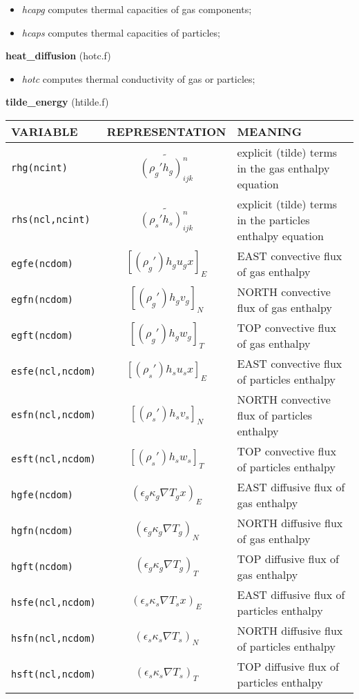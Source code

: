 \begin{itemize}
\item{\em hcapg} computes thermal capacities of gas components;
\item{\em hcaps} computes thermal capacities of particles;
\end{itemize}
%
%
{\large{\bf heat\_diffusion}} (hotc.f)\\
\begin{itemize}
\item{\em hotc} computes thermal conductivity of gas or particles;
\end{itemize}
%
%
{\large {\bf tilde\_energy}} (htilde.f)\\[5mm]
\begin{tabular}{|p{6cm}|c|p{6cm}|}\hline
VARIABLE & REPRESENTATION & MEANING\\\hline
\tt rhg(ncint) & $\widetilde{(\rho_g'h_g)_{ijk}^n}$ & explicit (tilde) terms in the gas enthalpy equation\\\hline
\tt rhs(ncl,ncint)& $\widetilde{(\rho_s' h_s)_{ijk}^n}$ & explicit (tilde) terms in the particles enthalpy equation\\\hline
\tt egfe(ncdom) & $\left[ (\rho_g')h_g u_g x \right]_{E}$ &EAST convective flux of gas enthalpy\\\hline
\tt egfn(ncdom) & $\left[ (\rho_g')h_g v_g \right]_{N}$ &NORTH convective flux of gas enthalpy\\\hline
\tt egft(ncdom) & $\left[ (\rho_g')h_g w_g \right]_{T}$ &TOP convective flux of gas enthalpy\\\hline
\tt esfe(ncl,ncdom)& $\left[ (\rho_s')h_su_s x\right]_{E}$ &EAST convective flux of particles enthalpy\\\hline
\tt esfn(ncl,ncdom)& $\left[ (\rho_s')h_sv_s \right]_{N}$ &NORTH convective flux of particles enthalpy\\\hline
\tt esft(ncl,ncdom)& $\left[ (\rho_s')h_sw_s \right]_{T}$ &TOP convective flux of particles enthalpy\\\hline
\tt hgfe(ncdom)&$ (\epsilon_g \kappa_g \nabla T_gx)_{E}$ &EAST diffusive flux of gas enthalpy\\\hline
\tt hgfn(ncdom)&$ (\epsilon_g \kappa_g \nabla T_g)_{N}$ &NORTH diffusive flux of gas enthalpy\\\hline
\tt hgft(ncdom)&$ (\epsilon_g \kappa_g \nabla T_g)_{T}$ &TOP diffusive flux of gas enthalpy\\\hline
\tt hsfe(ncl,ncdom)&$ (\epsilon_s \kappa_s \nabla T_sx)_{E}$ &EAST diffusive flux of particles enthalpy\\\hline
\tt hsfn(ncl,ncdom)&$ (\epsilon_s \kappa_s \nabla T_s)_{N}$ &NORTH diffusive flux of particles enthalpy\\\hline
\tt hsft(ncl,ncdom)&$ (\epsilon_s \kappa_s \nabla T_s)_{T}$ &TOP diffusive flux of particles enthalpy\\\hline
\end{tabular}\\
